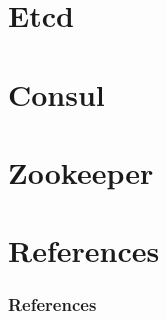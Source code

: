 \documentclass[aspectratio=169, usepdftitle=false]{beamer}
\begin{document}
\begin{frame}
\begin{columns}[c]
\begin{column}{0.25\textwidth}
\begin{tikzpicture}
			\end{tikzpicture}
		\end{column}
	\end{columns}
\end{frame}

\section{Etcd}


\section{Consul}


\section{Zookeeper}


\section{References}
\begin{frame}[allowframebreaks]
	\frametitle{References}
	\printbibliography
\end{frame}
\end{document}

